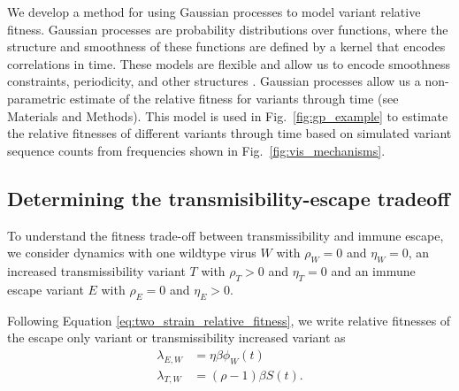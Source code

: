 \documentclass[12pt,oneside,letterpaper]{article}
\newcommand{\wt}{W}
\newcommand{\varE}{E}
\newcommand{\varT}{T}
\newcommand{\varEscape}{\eta}
\newcommand{\varTransmission}{\rho}
\begin{document}
We develop a method for using Gaussian processes to model variant relative fitness.
Gaussian processes are probability distributions over functions, where the structure and smoothness of these functions are defined by a kernel that encodes correlations in time.
These models are flexible and allow us to encode smoothness constraints, periodicity, and other structures \cite{Gortler2019a}.
Gaussian processes allow us a non-parametric estimate of the relative fitness for variants through time (see Materials and Methods).
This model is used in Fig.~\ref{fig:gp_example} to estimate the relative fitnesses of different variants through time based on simulated variant sequence counts from frequencies shown in Fig.~\ref{fig:vis_mechanisms}.

\subsection*{Determining the transmisibility-escape tradeoff}

To understand the fitness trade-off between transmissibility and immune escape, we consider dynamics with one wildtype virus $\wt$ with $\varTransmission_\wt = 0$ and $\varEscape_\wt = 0$, an increased transmissibility variant $\varT$ with $\varTransmission_\varT > 0$ and $\varEscape_\varT = 0$ and an immune escape variant $\varE$ with $\varTransmission_\varE = 0$ and $\varEscape_\varE > 0$.

Following Equation \ref{eq:two_strain_relative_fitness}, we write relative fitnesses of the escape only variant or transmissibility increased variant as
\begin{align*}
    \lambda_{\varE, \wt} &= \varEscape \beta \phi_{\wt}(t)\\
    \lambda_{\varT, \wt} &= (\varTransmission - 1) \beta S(t).
\end{align*}
\end{document}

